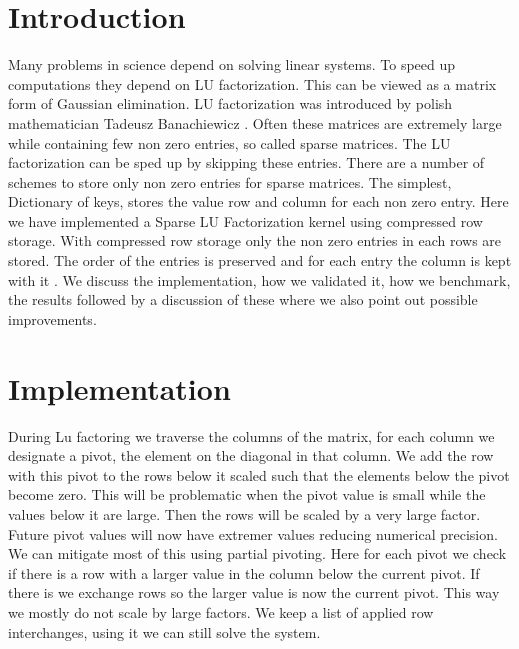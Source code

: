 \documentclass[10pt]{article}
\author{David Kleingeld, s1432982}
\title{}
\begin{document}

\maketitle

\section{Introduction}
Many problems in science depend on solving linear systems. To speed up computations they depend on LU factorization. This can be viewed as a matrix form of Gaussian elimination. LU factorization was introduced by polish mathematician Tadeusz Banachiewicz \cite{lu}.
Often these matrices are extremely large while containing few non zero entries, so called sparse matrices. The LU factorization can be sped up by skipping these entries. There are a number of schemes to store only non zero entries for sparse matrices. The simplest, Dictionary of keys, stores the value row and column for each non zero entry. Here we have implemented a Sparse LU Factorization kernel using compressed row storage. With compressed row storage only the non zero entries in each rows are stored. The order of the entries is preserved and for each entry the column is kept with it \cite{compressedRowStorage}. We discuss the implementation, how we validated it, how we benchmark, the results followed by a discussion of these where we also point out possible improvements. 

\section{Implementation}

During Lu factoring we traverse the columns of the matrix, for each column we designate a pivot, the element on the diagonal in that column. We add the row with this pivot to the rows below it scaled such that the elements below the pivot become zero. This will be problematic when the pivot value is small while the values below it are large. Then the rows will be scaled by a very large factor. Future pivot values will now have extremer values reducing numerical precision. 
We can mitigate most of this using partial pivoting. Here for each pivot we check if there is a row with a larger value in the column below the current pivot. If there is we exchange rows so the larger value is now the current pivot. This way we mostly do not scale by large factors. We keep a list of applied row interchanges, using it we can still solve the system.
\end{document}
